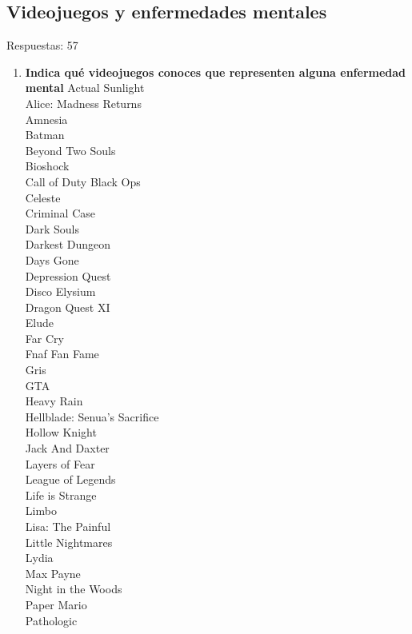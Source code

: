 \documentclass[12pt, a4paper,twoside,titlepage]{book}
\begin{document}
\subsection{Videojuegos y enfermedades mentales}
Respuestas: 57
\begin{enumerate}[label=\textbf{\arabic*}.]
     \item \textbf{Indica qué videojuegos conoces que representen alguna enfermedad mental}
        Actual Sunlight\\
        Alice: Madness Returns\\
        Amnesia\\
        Batman\\
        Beyond Two Souls\\
        Bioshock \\
        Call of Duty Black Ops\\
        Celeste\\
        Criminal Case\\
        Dark Souls\\
        Darkest Dungeon\\
        Days Gone\\
        Depression Quest\\
        Disco Elysium\\
        Dragon Quest XI\\
        Elude\\
        Far Cry\\
        Fnaf Fan Fame\\
        Gris\\
        GTA\\
        Heavy Rain \\
        Hellblade: Senua's Sacrifice\\
        Hollow Knight\\
        Jack And Daxter\\
        Layers of Fear\\
        League of Legends\\
        Life is Strange\\
        Limbo\\
        Lisa: The Painful\\
        Little Nightmares\\
        Lydia\\
        Max Payne\\
        Night in the Woods\\
        Paper Mario\\
        Pathologic\\

\end{enumerate}
\end{document}
